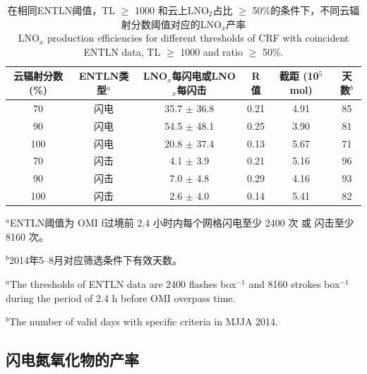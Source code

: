 \begin{table}[htbp]
\caption{在相同ENTLN阈值，TL $\geq$ 1000 和云上LNO$_2$占比 $\geq$ 50\%的条件下，不同云辐射分数阈值对应的LNO$_x$产率 \\ LNO$_x$ production efficiencies for different thresholds of CRF with coincident ENTLN data, TL $\geq$ 1000 and ratio $\geq$ 50\%.}
\footnotesize
\begin{tabular}{cccccc}
\hline
云辐射分数 (\%) & ENTLN类型$^a$    & LNO$_x$每闪电或LNO$_x$每闪击
& R值    & 截距 (10$^{5}$mol)  & 天数$^b$ \\
\hline
70  & 闪电  & 35.7  $\pm$ 36.8 & 0.21 & 4.91 & 85 \\
90  & 闪电  & 54.5  $\pm$ 48.1 & 0.25 & 3.90 & 81 \\
100 & 闪电  & 20.8  $\pm$ 37.4 & 0.13 & 5.67 & 71 \\
70  & 闪击 & 4.1   $\pm$ 3.9  & 0.21 & 5.16 & 96 \\
90  & 闪击 & 7.0   $\pm$ 4.8  & 0.29 & 4.16 & 93 \\
100 & 闪击 & 2.6   $\pm$ 4.0  & 0.14 & 5.41 & 82 \\
\hline
\end{tabular}
\begin{tablenotes}
\footnotesize
\item $^a$ENTLN阈值为 OMI f过境前 2.4 小时内每个网格闪电至少 2400 次 或 闪击至少8160 次。
\item $^b$2014年5--8月对应筛选条件下有效天数。
\item $^a$The thresholds of ENTLN data are 2400 flashes box$^{-1}$ and 8160 strokes box$^{-1}$ during the period of 2.4 h before OMI overpass time.
\item $^b$The number of valid days with specific criteria in MJJA 2014.
\end{tablenotes}
\label{table:CRFs}
\end{table}

\subsection{闪电氮氧化物的产率}

